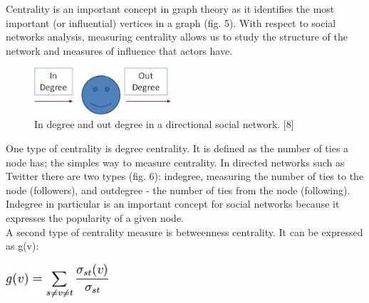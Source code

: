 \documentclass[conference,letterpaper]{IEEEtran}
\begin{document}
\indent
Centrality is an important concept in graph theory as it identifies the most important (or influential) vertices in a graph (fig. 5). With respect to social networks analysis, measuring centrality allows us to study the structure of the network and measures of influence that actors have.\\

\begin{center}
\begin{figure}[hb]
\centering
\includegraphics[width=2.0in]{degree_centrality}
\caption{
In degree and out degree in a directional social network. [8]
}
\label{fig_sim}
\end{figure}
\end{center}

One type of centrality is degree centrality. It is defined as the number of ties a node has; the simples way to measure centrality. In directed networks such as Twitter there are two types (fig. 6): indegree, measuring the number of ties to the node (followers), and outdegree - the number of ties from the node (following). Indegree in particular is an important concept for social networks because it expresses the popularity of a given node. \\
A second type of centrality measure is betweenness centrality. It can be expressed as g(v):

\centerline{
  \includegraphics[width=1.5in]{betweenness_centrality.png}
}
\end{document}
